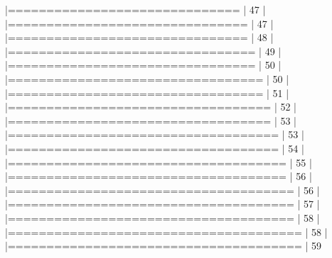 \documentclass[10pt]{article}
\newenvironment{CodeChunk}{}{}
\begin{document}
\begin{CodeChunk}
\begin{CodeChunk}
\begin{CodeOutput}
  |==============================                                   |  47%
  |                                                                       
  |===============================                                  |  47%
  |                                                                       
  |===============================                                  |  48%
  |                                                                       
  |================================                                 |  49%
  |                                                                       
  |================================                                 |  50%
  |                                                                       
  |=================================                                |  50%
  |                                                                       
  |=================================                                |  51%
  |                                                                       
  |==================================                               |  52%
  |                                                                       
  |==================================                               |  53%
  |                                                                       
  |===================================                              |  53%
  |                                                                       
  |===================================                              |  54%
  |                                                                       
  |====================================                             |  55%
  |                                                                       
  |====================================                             |  56%
  |                                                                       
  |=====================================                            |  56%
  |                                                                       
  |=====================================                            |  57%
  |                                                                       
  |=====================================                            |  58%
  |                                                                       
  |======================================                           |  58%
  |                                                                       
  |======================================                           |  59%

\end{CodeOutput}
\end{CodeChunk}
\end{CodeChunk}
\end{document}
